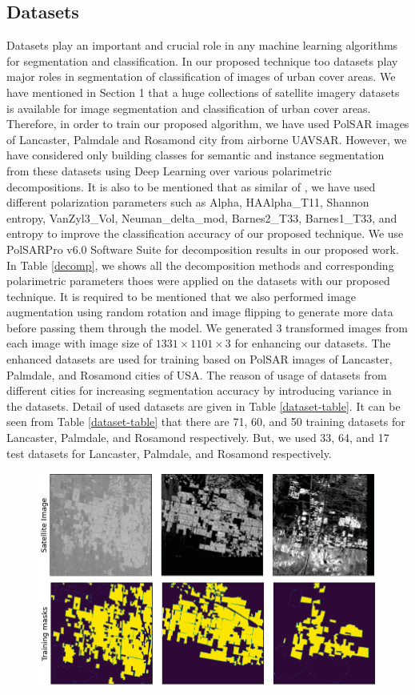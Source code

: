 \documentclass[a4paper,12pt]{spieman}  %
\begin{document}
\begin{spacing}{1}
\section{Datasets}
Datasets play an important and crucial role in any machine learning algorithms for segmentation and classification. In our proposed technique too datasets play major roles in segmentation of classification of images of urban cover areas. We have mentioned in Section 1 that a huge collections of
satellite imagery datasets is available for image segmentation and classification of urban cover areas. Therefore, in order to train our proposed algorithm, we have used PolSAR images of Lancaster, Palmdale and Rosamond city from airborne UAVSAR. However, we have considered only building classes for semantic and instance segmentation from these datasets using Deep Learning over various polarimetric decompositions. It is also to be mentioned that as similar of \cite{rs61212575}, we have used different polarization parameters such as Alpha, HAAlpha\_T11, Shannon entropy, VanZyl3\_Vol, Neuman\_delta\_mod, Barnes2\_T33, Barnes1\_T33, and entropy to improve the classification accuracy of our proposed technique. We use PolSARPro v6.0 Software Suite \cite{pottier2019polsarpro} for decomposition results in our proposed work. In Table \ref{decomp}, we shows all the decomposition methods and corresponding polarimetric parameters thoes were applied on the datasets with our proposed technique.
It is required to be mentioned that we also performed image augmentation using random rotation and image flipping to generate more data before passing them through the model. We generated $3$ transformed images from each image with image size of $1331 \times 1101 \times 3$ for enhancing our datasets. The enhanced datasets are used for training based on PolSAR images of Lancaster, Palmdale, and Rosamond cities of USA. The reason of usage of datasets from different cities for increasing segmentation accuracy by introducing variance in the datasets. Detail of used datasets are given in Table \ref{dataset-table}. It can be seen from Table \ref{dataset-table} that there are 71, 60, and 50 training datasets for Lancaster, Palmdale, and Rosamond respectively. But, we used 33, 64, and 17 test datasets for Lancaster, Palmdale, and Rosamond respectively.
\begin{figure}[t!]
\centering
\includegraphics[width=\textwidth]{data and mask.PNG}

\end{figure}
\end{spacing}
\end{document}
